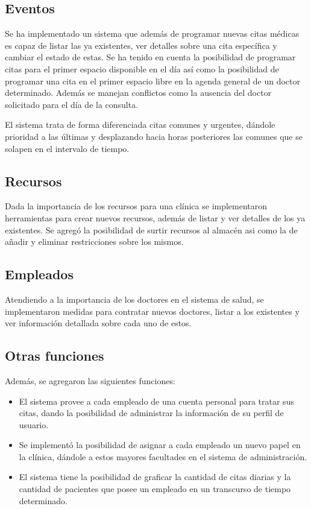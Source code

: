 \documentclass[12pt]{article}
\begin{document}
	\subsection{Eventos}
	Se ha implementado un sistema que además de programar nuevas citas médicas es capaz de listar las ya existentes, ver detalles sobre una cita específica y cambiar el estado de estas.
	Se ha tenido en cuenta la posibilidad de programar citas para el primer espacio disponible en el día así como la posibilidad de programar una cita en el primer espacio libre en la agenda general de un doctor determinado.
	Además se manejan conflictos como la ausencia del doctor solicitado para el día de la consulta.
	
	El sistema trata de forma diferenciada citas comunes y urgentes, dándole prioridad a las últimas y desplazando hacia horas posteriores las comunes que se solapen en el intervalo de tiempo.
	
	\subsection{Recursos}
	Dada la importancia de los recursos para una clínica se implementaron herramientas para crear nuevos recursos, además de listar y ver detalles de los ya existentes. Se agregó la posibilidad de surtir recursos al almacén asi como  la de añadir y eliminar restricciones sobre los mismos. 
	
	\subsection{Empleados}
	
	Atendiendo a la importancia de los doctores en el sistema de salud, se implementaron medidas para contratar nuevos doctores, listar a los existentes y ver información detallada sobre cada uno de estos.
	
	\subsection{Otras funciones}
	
	Además, se agregaron las siguientes funciones:
	
	\begin{itemize}
	\item El sistema provee a cada empleado de una cuenta personal para tratar sus citas, dando la posibilidad de administrar la información de su perfil de usuario.
	
	\item Se implementó la posibilidad de asignar a cada empleado un nuevo papel en la clínica, dándole a estos mayores facultades en el sistema de administración.

	\item El sistema tiene la posibilidad de graficar la cantidad de citas diarias y la cantidad de pacientes que posee un empleado en un transcurso de tiempo determinado.
\end{itemize}
	
\end{document}
